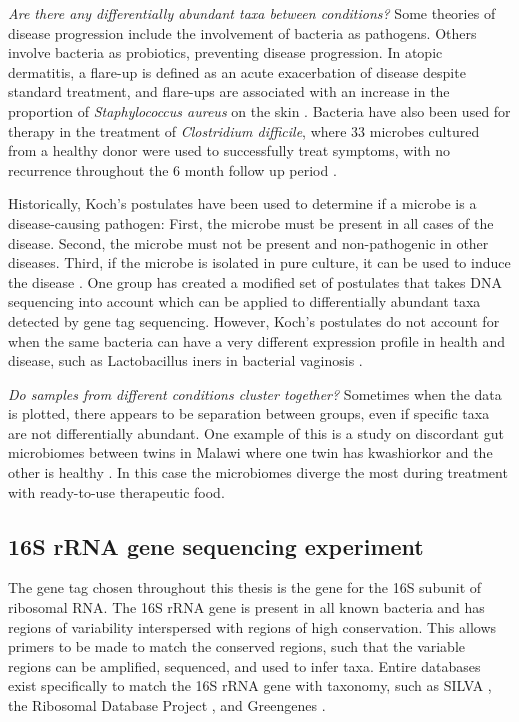 \textit{Are there any differentially abundant taxa between conditions?}
Some theories of disease progression include the involvement of bacteria as pathogens. Others involve bacteria as probiotics, preventing disease progression. In atopic dermatitis, a flare-up is defined as an acute exacerbation of disease despite standard treatment, and flare-ups are associated with an increase in the proportion of \textit{Staphylococcus aureus} on the skin \cite{kong2012temporal}. Bacteria have also been used for therapy in the treatment of \textit{Clostridium difficile}, where 33 microbes cultured from a healthy donor were used to successfully treat symptoms, with no recurrence throughout the 6 month follow up period \cite{petrof2013stool}.

Historically, Koch’s postulates have been used to determine if a microbe is a disease-causing pathogen: First, the microbe must be present in all cases of the disease. Second, the microbe must not be present and non-pathogenic in other diseases. Third, if the microbe is isolated in pure culture, it can be used to induce the disease \cite{koch1891uber}. One group has created a modified set of postulates that takes DNA sequencing into account \cite{fredericks1996sequence} which can be applied to differentially abundant taxa detected by gene tag sequencing. However, Koch’s postulates do not account for when the same bacteria can have a very different expression profile in health and disease, such as Lactobacillus iners in bacterial vaginosis \cite{macklaim2013comparative}.

\textit{Do samples from different conditions cluster together?}
Sometimes when the data is plotted, there appears to be separation between groups, even if specific taxa are not differentially abundant. One example of this is a study on discordant gut microbiomes between twins in Malawi where one twin has kwashiorkor and the other is healthy \cite{smith2013gut}. In this case the microbiomes diverge the most during treatment with ready-to-use therapeutic food.

\subsection{16S rRNA gene sequencing experiment}
The gene tag chosen throughout this thesis is the gene for the 16S subunit of ribosomal RNA. The 16S rRNA gene is present in all known bacteria and has regions of variability interspersed with regions of high conservation. This allows primers to be made to match the conserved regions, such that the variable regions can be amplified, sequenced, and used to infer taxa. Entire databases exist specifically to match the 16S rRNA gene with taxonomy, such as SILVA \cite{quast2013silva}, the Ribosomal Database Project \cite{cole2009ribosomal}, and Greengenes \cite{desantis2006greengenes}.

